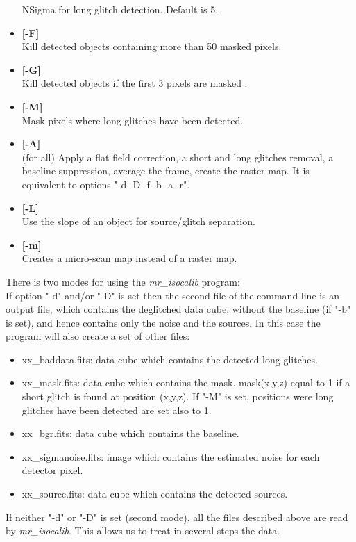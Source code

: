 \begin{itemize}
NSigma for long glitch detection. Default is 5. 
\item {\bf [-F]} \\ 
Kill detected objects containing more than 50 masked  pixels.
\item {\bf [-G]} \\
Kill detected objects if the first 3 pixels are masked .
\item {\bf [-M]} \\
Mask pixels where long glitches have been detected.
\item {\bf [-A]} \\
(for all) Apply a flat field correction, a short and long glitches removal,
a baseline suppression, average the frame, create the raster map. It is equivalent
to options "-d -D -f -b -a -r".
\item {\bf [-L]} \\
Use the slope of an object for source/glitch separation.
\item {\bf [-m]} \\
Creates a micro-scan map instead of a raster map.
\end{itemize}

There is two modes for using the {\em mr\_isocalib} program: \\
If option "-d" and/or "-D" is set then the second file of the command
line is an output file, which contains the deglitched data cube, without
the baseline (if "-b" is set), and hence contains only the 
noise and the sources. In this case  the program will also create
a set of other files:
\begin{itemize}
\item xx\_baddata.fits: data cube which contains the detected long glitches.
\item xx\_mask.fits: data cube which contains the mask. mask(x,y,z) equal
to 1 if a short glitch is found at position (x,y,z). If "-M" is set, 
positions were long glitches have been detected are set also to 1.
\item xx\_bgr.fits: data cube which contains the baseline.
\item xx\_sigmanoise.fits: image which contains the estimated noise for each
detector pixel.
\item xx\_source.fits: data cube which contains the detected sources.
\end{itemize}

If neither "-d" or "-D" is set (second mode), all the files described above are read 
by {\em mr\_isocalib}. This allows us to treat in several steps the data.

